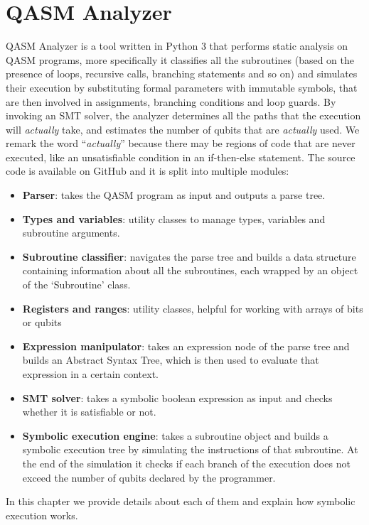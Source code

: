 \documentclass[12pt,a4paper]{report}
\theoremstyle{definition}
\theoremstyle{definition}
\theoremstyle{definition}
\begin{document}
\chapter{QASM Analyzer}
QASM Analyzer is a tool written in Python 3 that performs static analysis on QASM programs, more specifically it classifies all the subroutines (based on the presence of loops, recursive calls, branching statements and so on) and simulates their execution by substituting formal parameters with immutable symbols, that are then involved in assignments, branching conditions and loop guards. By invoking an SMT solver, the analyzer determines all the paths that the execution will \textit{actually} take, and estimates the number of qubits that are \textit{actually} used. We remark the word ``\textit{actually}'' because there may be regions of code that are never executed, like an unsatisfiable condition in an if-then-else statement.
The source code is available on GitHub \cite{lusvelt} and it is split into multiple modules:
\begin{itemize}
    \itemsep 0em
    \item \textbf{Parser}: takes the QASM program as input and outputs a parse tree.
    \item \textbf{Types and variables}: utility classes to manage types, variables and subroutine arguments.
    \item \textbf{Subroutine classifier}: navigates the parse tree and builds a data structure containing information about all the subroutines, each wrapped by an object of the `Subroutine' class.
    \item \textbf{Registers and ranges}: utility classes, helpful for working with arrays of bits or qubits
    \item \textbf{Expression manipulator}: takes an expression node of the parse tree and builds an Abstract Syntax Tree, which is then used to evaluate that expression in a certain context.
    \item \textbf{SMT solver}: takes a symbolic boolean expression as input and checks whether it is satisfiable or not.
    \item \textbf{Symbolic execution engine}: takes a subroutine object and builds a symbolic execution tree by simulating the instructions of that subroutine. At the end of the simulation it checks if each branch of the execution does not exceed the number of qubits declared by the programmer.
\end{itemize}
In this chapter we provide details about each of them and explain how symbolic execution works.
\end{document}
